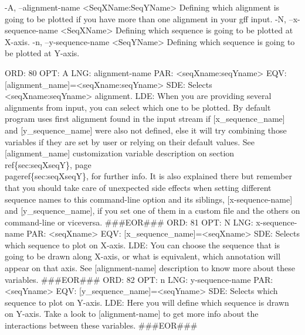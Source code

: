 \documentclass[11pt]{article}
\def\nwendcode{\endtrivlist \endgroup} %
\let\nwdocspar=\par                    %
\begin{document}
-A, --alignment-name <SeqXName:SeqYName>
     Defining which alignment is going to be plotted 
     if you have more than one alignment in your gff input.
-N, --x-sequence-name <SeqXName>
     Defining which sequence is going to be plotted at X-axis.
-n, --y-sequence-name <SeqYName>
     Defining which sequence is going to be plotted at Y-axis.
\nwendcode{}\nwdocspar
\nwenddocs{}\plusendmoddef
ORD: 80
OPT: A
LNG: alignment-name
PAR: <seqXname:seqYname>
EQV: [alignment_name]=<seqXname:seqYname>
SDE: Selects <seqXname:seqYname> alignment.
LDE: 
When you are providing several alignments from input, you can select which one
to be plotted. By default program uses first alignment found in the input 
stream if [x_sequence_name] and [y_sequence_name] were also not defined, else
it will try combining those variables if they are set by user or relying on 
their default values. See [alignment_name] customization variable description
on section~\\ref\{sec:seqXseqY\}, page~\\pageref\{sec:seqXseqY\}, for further info.
It is also explained there but remember that you should take care of unexpected
side effects when setting different sequence names to this command-line option
and its siblings, [x-sequence-name] and [y_sequence_name], if you set one of 
them in a custom file and the others on command-line or viceversa.
###EOR###
ORD: 81
OPT: N
LNG: x-sequence-name
PAR: <seqXname>
EQV: [x_sequence_name]=<seqXname>
SDE: Selects which sequence to plot on X-axis.
LDE: 
You can choose the sequence that is going to be drawn along X-axis, or what
is equivalent, which annotation will appear on that axis. See [alignment-name] 
description to know more about these variables.
###EOR###
ORD: 82
OPT: n
LNG: y-sequence-name
PAR: <seqYname>
EQV: [y_sequence_name]=<seqYname>
SDE: Selects which sequence to plot on Y-axis.
LDE: 
Here you will define which sequence is drawn on Y-axis. Take a look to 
[alignment-name] to get more info about the interactions between these variables.
###EOR###
\nwendcode{}\nwdocspar
\nwenddocs{}\plusendmoddef
\end{document}
